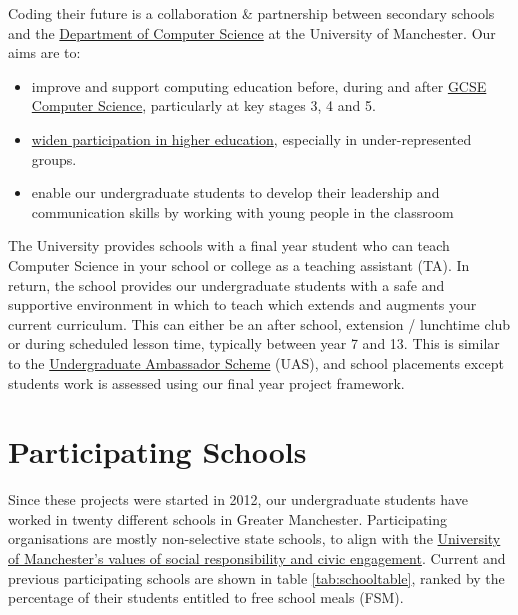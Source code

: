 \documentclass[
  12pt,
]{book}
\providecommand{\tightlist}{%
  \setlength{\itemsep}{0pt}\setlength{\parskip}{0pt}}
\begin{document}
Coding their future is a collaboration \& partnership between secondary schools and the \href{https://www.cs.manchester.ac.uk/}{Department of Computer Science} at the University of Manchester. Our aims are to:

\begin{itemize}
\tightlist
\item
  improve and support computing education before, during and after \href{https://www.bbc.co.uk/bitesize/subjects/z34k7ty}{GCSE Computer Science}, particularly at key stages 3, 4 and 5. \citep{shutdownrestart, afterthereboot, cse, cambridgegcse}
\item
  \href{https://www.manchester.ac.uk/discover/social-responsibility/widening-participation/}{widen participation in higher education}, especially in under-represented groups. \citep{assir, classceiling, nicebutdim, breakintoelite}
\item
  enable our undergraduate students to develop their leadership and communication skills by working with young people in the classroom
\end{itemize}

The University provides schools with a final year student who can teach Computer Science in your school or college as a teaching assistant (TA). In return, the school provides our undergraduate students with a safe and supportive environment in which to teach which extends and augments your current curriculum. This can either be an after school, extension / lunchtime club or during scheduled lesson time, typically between year 7 and 13. This is similar to the \href{https://en.wikipedia.org/wiki/Undergraduate_Ambassadors_Scheme}{Undergraduate Ambassador Scheme} (UAS), \citep{uas, Cooper2005} and school placements \citep{Moller2019} except students work is assessed using our final year project framework. \citep{COMP30030, COMP30040}

\hypertarget{schools}{%
\section{Participating Schools}\label{schools}}

Since these projects were started in 2012, our undergraduate students have worked in twenty different schools in Greater Manchester. Participating organisations are mostly non-selective state schools, to align with the \href{https://www.manchester.ac.uk/discover/vision/}{University of Manchester's values of social responsibility and civic engagement}. Current and previous participating schools are shown in table \ref{tab:schooltable}, ranked by the percentage of their students entitled to free school meals (FSM).
\end{document}
